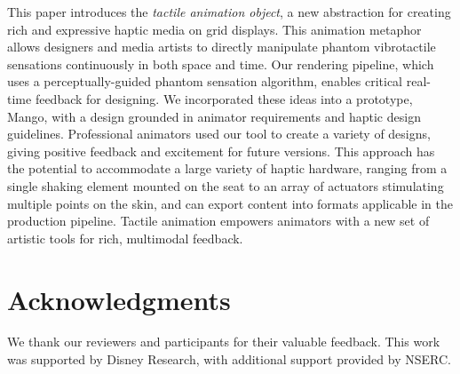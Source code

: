This paper introduces the \emph{tactile animation object}, a new abstraction for creating rich and expressive haptic media on grid displays.
This animation metaphor allows designers and media artists to directly manipulate phantom vibrotactile sensations continuously in both space and time.
Our rendering pipeline, which uses a perceptually-guided phantom sensation algorithm, enables critical real-time feedback for designing.
We incorporated these ideas into a prototype, Mango, with a design grounded in animator requirements and haptic design guidelines.
Professional animators used our tool to create a variety of designs, giving positive feedback and excitement for future versions.
This approach has the potential to %
accommodate a large variety of haptic hardware, ranging from a single shaking element mounted on the seat to an array of actuators stimulating multiple points on the skin, and can export content into formats applicable in the production pipeline.
Tactile animation empowers animators with a new set of artistic tools for rich, multimodal feedback. 

\section{Acknowledgments}
We thank our reviewers and participants for their valuable feedback.
This work was supported by Disney Research, with
additional support provided by NSERC.


